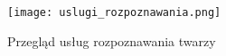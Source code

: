 \begin{figure}[H]
	\centering
	\texttt{[image: uslugi\_rozpoznawania.png]}
	\caption{Przegląd usług rozpoznawania twarzy}
	\label{fig:picamera}
\end{figure}